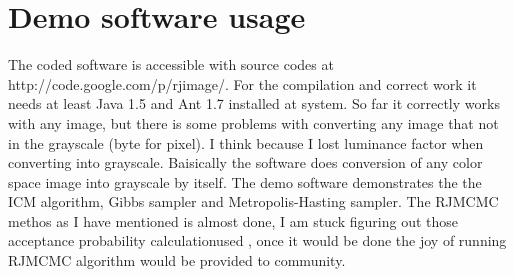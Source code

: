 \documentclass[journal]{IEEEtran}
\begin{document}
%
%
\appendix
\section{Demo software usage}
The coded software is accessible with source codes at http://code.google.com/p/rjimage/. For the compilation and correct work it needs at least Java 1.5 and Ant 1.7 installed at system. So far it correctly works with any image, but there is some problems with converting any image that not in the grayscale (byte for pixel). I think because I lost luminance factor when converting into grayscale. Baisically the software does conversion of any color space image into grayscale by itself. The demo software demonstrates the the ICM algorithm, Gibbs sampler and Metropolis-Hasting sampler. The RJMCMC methos as I have mentioned is almost done, I am stuck figuring out those acceptance probability calculationused , once it would be done the joy of running RJMCMC algorithm would be provided to community.


\end{document}
